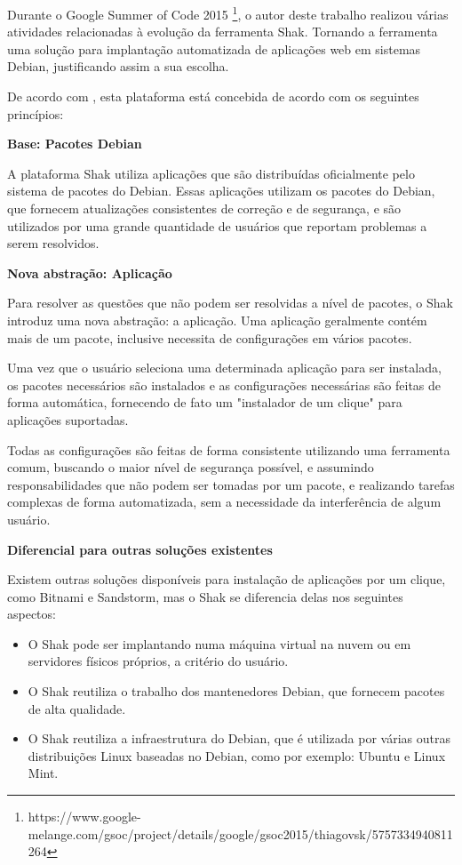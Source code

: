 Durante o Google Summer of Code 2015 \footnote{https://www.google-melange.com/gsoc/project/details/google/gsoc2015/thiagovsk/5757334940811264}, o autor deste trabalho realizou 
várias atividades relacionadas à evolução da ferramenta Shak. Tornando a ferramenta uma
 solução para implantação automatizada de aplicações web em sistemas Debian, 
justificando assim a sua escolha.

De acordo com , esta plataforma está concebida de acordo 
com os seguintes princípios:

\textbf{Base: Pacotes Debian}

A plataforma Shak utiliza aplicações que são distribuídas oficialmente pelo sistema de pacotes do Debian. Essas aplicações utilizam os
pacotes do Debian, que fornecem atualizações consistentes de correção e de segurança,
e são utilizados por uma grande quantidade de usuários que reportam problemas a
serem resolvidos. 

\textbf{Nova abstração: Aplicação}

Para resolver as questões que não podem ser resolvidas a nível de pacotes, o
Shak introduz uma nova abstração: a aplicação. Uma aplicação geralmente
contém mais de um pacote, inclusive necessita de configurações em vários pacotes.

Uma vez que o usuário seleciona uma determinada aplicação para
ser instalada, os pacotes necessários são instalados e as configurações
necessárias são feitas de forma automática, fornecendo de fato um "instalador
de um clique" para aplicações suportadas. 

Todas as configurações são feitas de
forma consistente utilizando uma ferramenta comum, buscando o maior nível de
segurança possível, e assumindo responsabilidades que não podem ser tomadas por
um pacote, e realizando tarefas complexas de forma automatizada, sem a necessidade
da interferência de algum usuário.

\textbf{Diferencial para outras soluções existentes}

Existem outras soluções disponíveis para instalação de aplicações por um clique,
como Bitnami e Sandstorm, mas o Shak se
diferencia delas nos seguintes aspectos:

\begin{itemize}
  \item O Shak pode ser implantando numa máquina virtual na nuvem ou em servidores físicos
    próprios, a critério do usuário.

  \item O Shak reutiliza o trabalho dos mantenedores Debian, que fornecem pacotes
    de alta qualidade.

  \item O Shak reutiliza a infraestrutura do Debian, que é utilizada por várias
outras distribuições Linux baseadas no Debian, como por exemplo: Ubuntu e Linux Mint.

\end{itemize}


